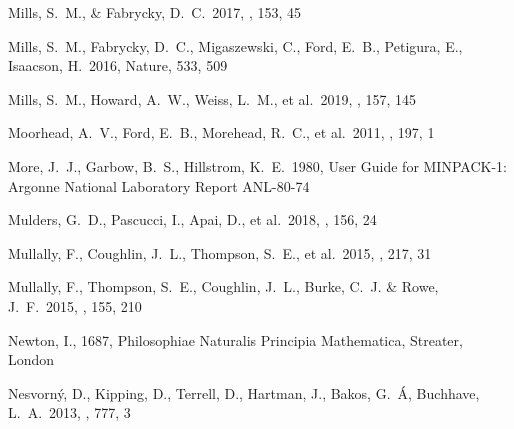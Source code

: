 \documentclass{aastex62}
\begin{document}
\begin{thebibliography}{}
 Mills, S.~M., \& Fabrycky, D.~C.~2017, \aj, 153, 45


 Mills, S.~M., Fabrycky, D.~C., Migaszewski, C., Ford, E.~B., Petigura, E., Isaacson, H.~2016, Nature,  533,  509

 Mills, S.~M., Howard, A.~W., Weiss, L.~M., et al.~2019, \aj, 157, 145

 Moorhead, A.~V., Ford, E.~B., Morehead, R.~C., et al.~2011, \apjs, 197, 1

 More, J.~J., Garbow, B.~S., Hillstrom, K.~E.~1980, User Guide for MINPACK-1: Argonne National Laboratory Report ANL-80-74





 Mulders, G.~D., Pascucci, I., Apai, D., et al.\ 2018, \aj, 156, 24 %

 Mullally, F., Coughlin, J.~L., Thompson, S.~E., et al.~2015, \apjs, 217, 31

 Mullally, F., Thompson, S.~E., Coughlin, J.~L., Burke, C.~J. \& Rowe, J.~F.~2015, \aj, 155, 210

 Newton, I., 1687, Philosophiae Naturalis Principia Mathematica, Streater, London


 Nesvorn{\'y}, D., Kipping, D., Terrell, D., Hartman, J., Bakos, G.~{\'A}, Buchhave, L.~A.~2013, \apj, 777, 3


\end{thebibliography}
\end{document}
